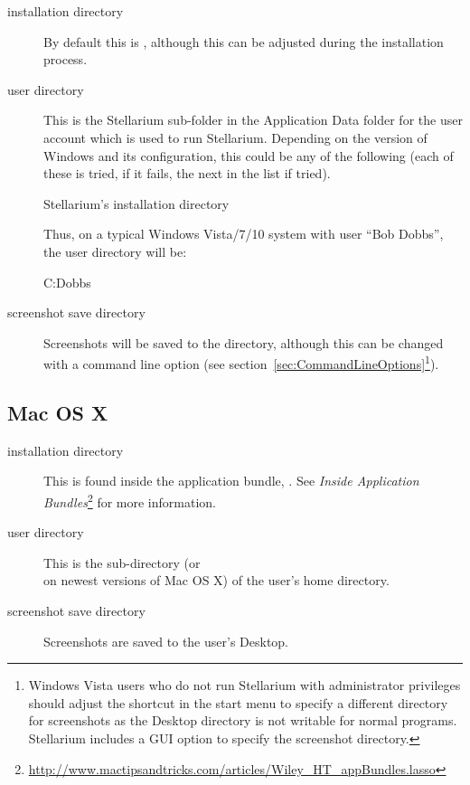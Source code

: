 \begin{description}
\item[installation directory] By default this is
  ,
  although this can be adjusted during the installation process.
\item[user directory] This is the Stellarium sub-folder in the
  Application Data folder for the user account which is used to run
  Stellarium. Depending on the version of Windows and its configuration,
  this could be any of the following (each of these is tried, if it
  fails, the next in the list if tried).

\begin{commands}
Stellarium's installation directory
\end{commands}

Thus, on a typical Windows Vista/7/10 system with user ``Bob
Dobbs'', the user directory will be:

\begin{commands}
C:\Users\Bob Dobbs\AppData\Roaming\Stellarium\
\end{commands}

\item[screenshot save directory] Screenshots will be saved to the
  \file{Pictures/Stellarium} directory, although this can be changed with a command line option (see
  section~\ref{sec:CommandLineOptions}\footnote{Windows Vista users who do not run Stellarium with
    administrator privileges should adjust the shortcut in the start
    menu to specify a different directory for screenshots as the Desktop
    directory is not writable for normal programs. 
    Stellarium includes a GUI option to specify the screenshot
    directory.}).
\end{description}

\subsection{Mac OS X}
\label{sec:FilesAndDirectories:MacOSX}

\begin{description}
\item[installation directory] This is found inside the application
  bundle, \file{Stellarium.app}. See \emph{Inside Application
    Bundles}\footnote{\url{http://www.mactipsandtricks.com/articles/Wiley_HT_appBundles.lasso}}
  for more information.
\item[user directory] This is the sub-directory 
   (or \\
   on
  newest versions of Mac OS X) of the user's home
  directory.
\item[screenshot save directory] Screenshots are saved to the user's
  Desktop.
\end{description}

